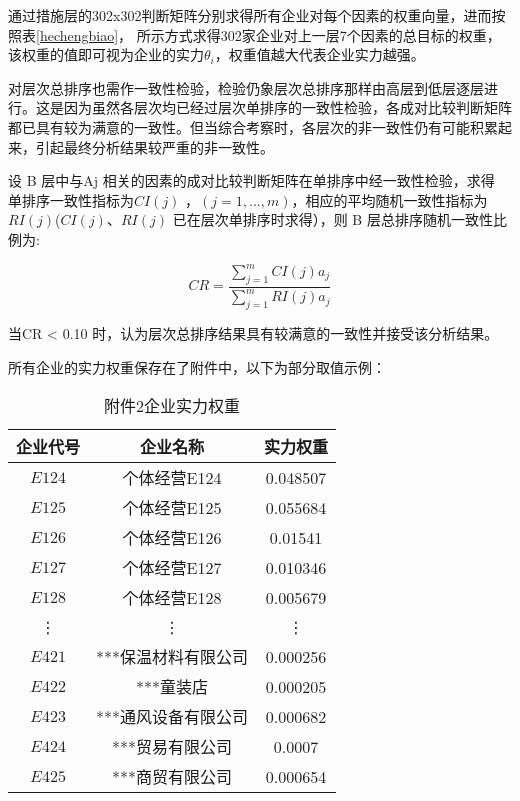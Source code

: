 \documentclass{cumcmthesis}
\begin{document}
通过措施层的302x302判断矩阵分别求得所有企业对每个因素的权重向量，进而按照表\ref{hechengbiao}，
所示方式求得302家企业对上一层7个因素的总目标的权重，该权重的值即可视为企业的实力$\theta_i$，权重值越大代表企业实力越强。

对层次总排序也需作一致性检验，检验仍象层次总排序那样由高层到低层逐层进行。这是因为虽然各层次均已经过层次单排序的一致性检验，各成对比较判断矩阵都已具有较为满意的一致性。但当综合考察时，各层次的非一致性仍有可能积累起来，引起最终分析结果较严重的非一致性。

设 B 层中与Aj 相关的因素的成对比较判断矩阵在单排序中经一致性检验，求得
单排序一致性指标为$CI\left(j\right)$ ，$\left(j = 1,...,m\right)$，相应的平均随机一致性指标为 $RI\left(j\right)$($CI\left(j\right)$、$RI\left(j\right)$ 已在层次单排序时求得），则 B 层总排序随机一致性比例为:


\begin{equation}
    CR = \frac{\sum^{m}_{j=1}CI\left(j\right)a_j}{\sum^{m}_{j=1}RI\left(j\right)a_j}
\end{equation}

当CR < 0.10 时，认为层次总排序结果具有较满意的一致性并接受该分析结果。 

所有企业的实力权重保存在了附件中，以下为部分取值示例：

\begin{table}[H]
    \begin{center}
    \begin{tabular}{|c|c|c|}
        \hline
    企业代号 & 企业名称 & 实力权重\\
    \hline
    $E124$ & 个体经营E124 & 0.048507\\
    $E125$ & 个体经营E125 & 0.055684\\
    $E126$ & 个体经营E126 & 0.01541\\
    $E127$ & 个体经营E127 & 0.010346\\
    $E128$ & 个体经营E128 & 0.005679\\
    \vdots & \vdots & \vdots\\
    $E421$ & ***保温材料有限公司 & 0.000256\\
    $E422$ & ***童装店          & 0.000205\\
    $E423$ & ***通风设备有限公司 & 0.000682\\
    $E424$ & ***贸易有限公司 & 0.0007\\
    $E425$ & ***商贸有限公司 & 0.000654\\
    \hline
    \end{tabular}
    \end{center}
    \caption{附件2企业实力权重}
    \label{tablecenci}
    \end{table}
\end{document}
